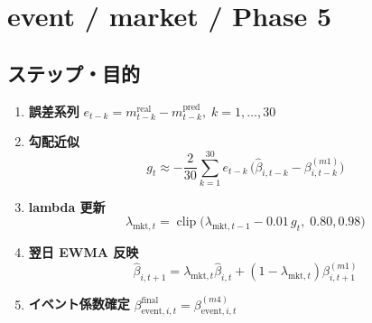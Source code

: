 
\section*{event / market / Phase 5}\nopagebreak[4]
\subsection*{ステップ・目的}
\begin{flushleft}
\begin{enumerate}
  \item \textbf{誤差系列}
        \(e_{t-k}=m_{t-k}^{\text{real}}-m_{t-k}^{\text{pred}},\;k=1,\dots,30\)
  \item \textbf{勾配近似}
        \[
          g_t\approx-\dfrac{2}{30}
            \sum_{k=1}^{30}
            e_{t-k}\,\bigl(\hat\beta_{i,t-k}-\beta_{i,t-k}^{(m1)}\bigr)
        \]
  \item \textbf{lambda 更新}
        \[
          \lambda_{\text{mkt},t}
            =\operatorname{clip}\bigl(
               \lambda_{\text{mkt},t-1}-0.01\,g_t,\;0.80,0.98
             \bigr)
        \]
  \item \textbf{翌日 EWMA 反映}
        \[
          \hat\beta_{i,t+1}
            =\lambda_{\text{mkt},t}\hat\beta_{i,t}
             +(1-\lambda_{\text{mkt},t})\beta_{i,t+1}^{(m1)}
        \]
  \item \textbf{イベント係数確定}
        \(
          \beta_{\text{event},i,t}^{\text{final}}
            =\beta_{\text{event},i,t}^{(m4)}
        \)
\end{enumerate}
\end{flushleft}

